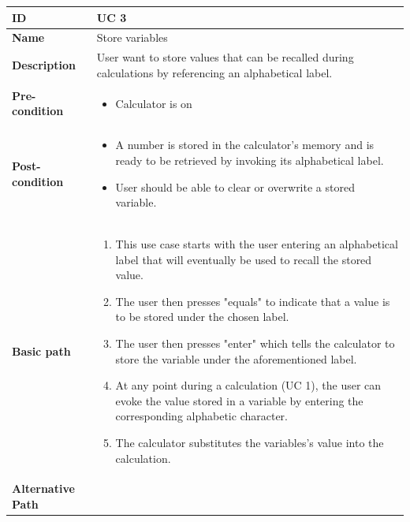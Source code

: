 \documentclass[a4paper]{article}
\begin{document}
\begin{table}[!h]
\begin{tabular}{|p{3cm}|p{9cm}|}
\hline
\textbf{ID} & UC 3  \\ \hline
\textbf{Name} & Store variables  \\ \hline
\textbf{Description} & User want to store values that can be recalled during calculations by referencing an alphabetical label.  \\ \hline
\textbf{Pre-condition} &
	\begin{itemize}
		\vspace{-2mm}
		\item Calculator is on
		\vspace{-3.5mm}
	\end{itemize}  \\ \hline
\textbf{Post-condition} &
	\begin{itemize}
		\vspace{-2mm}
		\item A number is stored in the calculator's memory and is ready to be retrieved by invoking its alphabetical label.
		\item User should be able to clear or overwrite a stored variable.
		\vspace{-3.5mm}
	\end{itemize}  \\ \hline
\textbf{Basic path} &
	\begin{enumerate}
		\vspace{-2mm}
		\item This use case starts with the user entering an alphabetical label that will eventually be used to recall the stored value.
		\item The user then presses "equals" to indicate that a value is to be stored under the chosen label.
		\item The user then presses "enter" which tells the calculator to store the variable under the aforementioned label.
		\item At any point during a calculation (UC 1), the user can evoke the value stored in a variable by entering the corresponding alphabetic character.
		\item The calculator substitutes the variables's value into the calculation.
		\vspace{-3.5mm}
	\end{enumerate}  \\ \hline
\textbf{Alternative Path} &
	\begin{itemize}[leftmargin=6mm]
		\vspace{-2mm}

\end{itemize}
\end{tabular}
\end{table}
\end{document}
